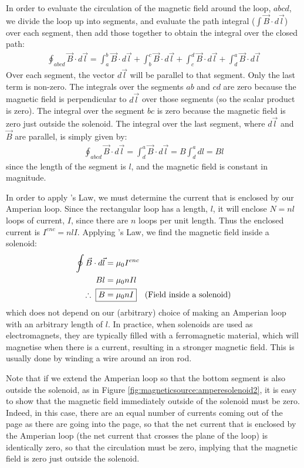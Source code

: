 In order to evaluate the circulation of the magnetic field around the loop, $abcd$, we divide the loop up into segments, and evaluate the path integral ($\int \vec B \cdot d\vec l$) over each segment, then add those together to obtain the integral over the closed path:
\begin{align*}
\oint_{abcd} \vec B \cdot d\vec l = \int_a^b \vec B \cdot d\vec l + \int_b^c \vec B \cdot d\vec l + \int_c^d \vec B \cdot d\vec l + \int_d^a \vec B \cdot d\vec l 
\end{align*}
Over each segment, the vector $d\vec l$ will be parallel to that segment. Only the last term is non-zero. The integrals over the segments $ab$ and $cd$ are zero because the magnetic field is perpendicular to $d\vec l$ over those segments (so the scalar product is zero). The integral over the segment $bc$ is zero because the magnetic field is zero just outside the solenoid. The integral over the last segment, where $d\vec l$ and $\vec B$ are parallel, is simply given by:
\begin{align*}
\oint_{abcd} \vec B \cdot d\vec l = \int_d^a \vec B \cdot d\vec l = B \int_d^a dl = Bl
\end{align*}
since the length of the segment is $l$, and the magnetic field is constant in magnitude.

In order to apply \ampere's Law, we must determine the current that is enclosed by our Amperian loop. Since the rectangular loop has a length, $l$, it will enclose $N=nl$ loops of current, $I$, since there are $n$ loops per unit length. Thus the enclosed current is $I^{enc}=nlI$. Applying \ampere's Law, we find the magnetic field inside a solenoid:
\begin{align*}
\oint \vec B \cdot d\vec l &=\mu_0 I^{enc}\\
Bl &= \mu_0 nIl\\
\therefore\;\; \Aboxed{B &= \mu_0 nI}\quad \text{(Field inside a solenoid)}
\end{align*}
which does not depend on our (arbitrary) choice of making an Amperian loop with an arbitrary length of $l$. In practice, when solenoids are used as electromagnets, they are typically filled with a ferromagnetic material, which will magnetise when there is a current, resulting in a stronger magnetic field. This is usually done by winding a wire around an iron rod. 

Note that if we extend the Amperian loop so that the bottom segment is also outside the solenoid, as in Figure \ref{fig:magneticsource:amperesolenoid2}, it is easy to show that the magnetic field immediately outside of the solenoid must be zero. Indeed, in this case, there are an equal number of currents coming out of the page as there are going into the page, so that the net current that is enclosed by the Amperian loop (the net current that crosses the plane of the loop) is identically zero, so that the circulation must be zero, implying that the magnetic field is zero just outside the solenoid.

